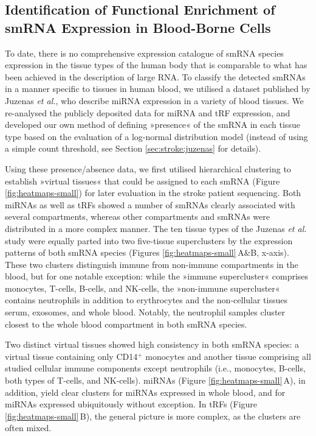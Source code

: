 \subsection{Identification of Functional Enrichment of \\smRNA Expression in Blood-Borne Cells}
To date, there is no comprehensive expression catalogue of smRNA species expression in the tissue types of the human body that is comparable to what has been achieved in the description of large RNA. To classify the detected smRNAs in a manner specific to tissues in human blood, we utilised a dataset published by Juzenas \emph{et al.},\cite{Juzenas2017} who describe miRNA expression in a variety of blood tissues. We re-analysed the publicly deposited data for miRNA and tRF expression, and developed our own method of defining »presence« of the smRNA in each tissue type based on the evaluation of a log-normal distribution model (instead of using a simple count threshold, see Section \ref{sec:stroke:juzenas} for details). 

Using these presence/absence data, we first utilised hierarchical clustering to establish »virtual tissues« that could be assigned to each smRNA (Figure \ref{fig:heatmaps-small}) for later evaluation in the stroke patient sequencing. Both miRNAs as well as tRFs showed a number of smRNAs clearly associated with several compartments, whereas other compartments and smRNAs were distributed in a more complex manner. The ten tissue types of the Juzenas \emph{et al.}\cite{Juzenas2017} study were equally parted into two five-tissue superclusters by the expression patterns of both smRNA species (Figures \ref{fig:heatmaps-small}\,A\&B, x-axis). These two clusters distinguish immune from non-immune compartments in the blood, but for one notable exception: while the »immune supercluster« comprises monocytes, T-cells, B-cells, and NK-cells, the »non-immune supercluster« contains neutrophils in addition to erythrocytes and the non-cellular tissues serum, exosomes, and whole blood. Notably, the neutrophil samples cluster closest to the whole blood compartment in both smRNA species.

Two distinct virtual tissues showed high consistency in both smRNA species: a virtual tissue containing only CD14$^+$ monocytes and another tissue comprising all studied cellular immune components except neutrophils (i.e., monocytes, B-cells, both types of T-cells, and NK-cells). miRNAs (Figure \ref{fig:heatmaps-small}\,A), in addition, yield clear clusters for miRNAs expressed in whole blood, and for miRNAs expressed ubiquitously without exception. In tRFs (Figure \ref{fig:heatmaps-small}\,B), the general picture is more complex, as the clusters are often mixed.

